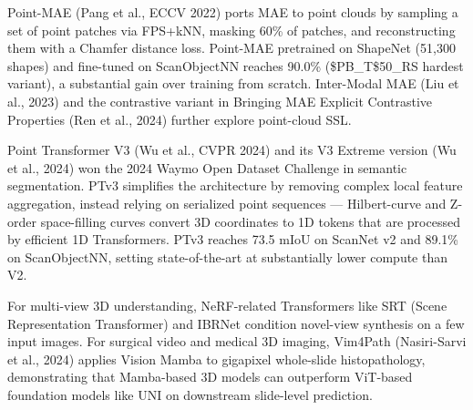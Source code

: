 Point-MAE (Pang et al., ECCV 2022) ports MAE to point clouds by sampling a set of point patches via FPS+kNN, masking 60\% of patches, and reconstructing them with a Chamfer distance loss. Point-MAE pretrained on ShapeNet (51,300 shapes) and fine-tuned on ScanObjectNN reaches 90.0\% (\$PB\_T\$50\_RS hardest variant), a substantial gain over training from scratch. Inter-Modal MAE (Liu et al., 2023) and the contrastive variant in Bringing MAE Explicit Contrastive Properties (Ren et al., 2024) further explore point-cloud SSL.

Point Transformer V3 (Wu et al., CVPR 2024) and its V3 Extreme version (Wu et al., 2024) won the 2024 Waymo Open Dataset Challenge in semantic segmentation. PTv3 simplifies the architecture by removing complex local feature aggregation, instead relying on serialized point sequences --- Hilbert-curve and Z-order space-filling curves convert 3D coordinates to 1D tokens that are processed by efficient 1D Transformers. PTv3 reaches 73.5 mIoU on ScanNet v2 and 89.1\% on ScanObjectNN, setting state-of-the-art at substantially lower compute than V2.

For multi-view 3D understanding, NeRF-related Transformers like SRT (Scene Representation Transformer) and IBRNet condition novel-view synthesis on a few input images. For surgical video and medical 3D imaging, Vim4Path (Nasiri-Sarvi et al., 2024) applies Vision Mamba to gigapixel whole-slide histopathology, demonstrating that Mamba-based 3D models can outperform ViT-based foundation models like UNI on downstream slide-level prediction.

